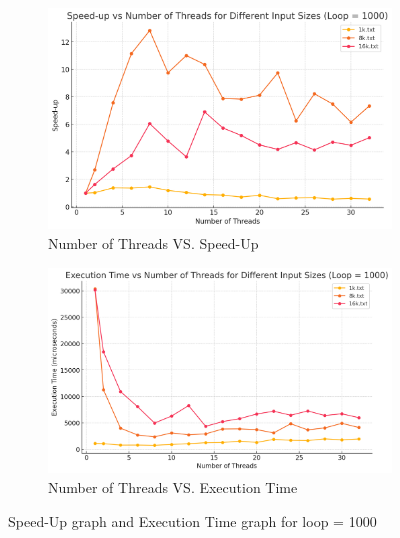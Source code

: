 \documentclass[letterpaper,12pt]{article}
\theoremstyle{remark}
\begin{document}
\hfill  %


\begin{figure}[H]
    \centering
    \begin{subfigure}[t]{0.48\textwidth}  %
        \centering
        \includegraphics[width=\textwidth]{loop1000Sleep.png}
        \caption{Number of Threads VS. Speed-Up}
        \label{fig:ThreadVsSpeedUp1}
    \end{subfigure}
    \hfill  %
    \begin{subfigure}[t]{0.48\textwidth}  %
        \centering
        \includegraphics[width=\textwidth]{loop1000ExecutionTime.png}
        \caption{Number of Threads VS. Execution Time}
        \label{fig:ThreadVsExecutionTime}
    \end{subfigure}
    \caption{Speed-Up graph and Execution Time graph for loop = 1000}
    \label{fig:ThreadVsComparison}
\end{figure}
\end{document}
